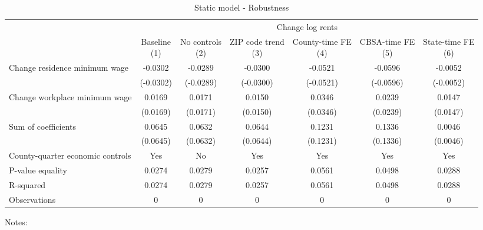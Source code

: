 \begin{table}
    \caption{Static model - Robustness}
    \label{tab:static_robust}
    \centering

    \begin{tabular}{@{}lcccccc@{}}
        \toprule
                                                  & \multicolumn{6}{c}{Change log rents}                                          \\ \cmidrule(l){2-7}
                                                  & \shortstack{Baseline\\(1)}       & \shortstack{No controls\\(2)} & \shortstack{ZIP code trend\\(3)} 
                                                  & \shortstack{County-time FE\\(4)} & \shortstack{CBSA-time FE\\(5)} & \shortstack{State-time FE\\(6)} \\ \midrule
        Change residence minimum wage             & -0.0302      & -0.0289         & -0.0300       & -0.0521        & -0.0596       & -0.0052             \\
                                                  & (-0.0302)    & (-0.0289)       & (-0.0300)     & (-0.0521)      & (-0.0596)     & (-0.0052)           \\
        Change workplace minimum wage             & 0.0169      & 0.0171         & 0.0150       & 0.0346        & 0.0239       & 0.0147             \\
                                                  & (0.0169)    & (0.0171)       & (0.0150)     & (0.0346)      & (0.0239)     & (0.0147)           \\
        Sum of coefficients                       & 0.0645      & 0.0632         & 0.0644       & 0.1231        & 0.1336       & 0.0046             \\
                                                  & (0.0645)    & (0.0632)       & (0.0644)     & (0.1231)      & (0.1336)     & (0.0046)           \\ \midrule
        County-quarter economic controls               & Yes      &  No         & Yes       & Yes        & Yes       & Yes             \\
        P-value equality                          & 0.0274      & 0.0279         & 0.0257       & 0.0561        & 0.0498       & 0.0288             \\
        R-squared                                 & 0.0274      & 0.0279         & 0.0257       & 0.0561        & 0.0498       & 0.0288             \\
        Observations                              & 0     & 0        & 0      & 0       & 0      & 0            \\ \bottomrule
    \end{tabular}

    \begin{minipage}{.95\textwidth} \footnotesize
        \vspace{2mm}
        Notes: 
    \end{minipage}
\end{table}
